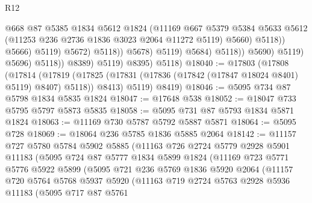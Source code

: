 \begin{lexlean}{R12}
\begin{coremodule}
                                              @668
                                              @87
                                              @5385
                                              @1834
                                              @5612
                                              @1824
                                              (@11169
                                                @667
                                                @5379
                                                @5384
                                                @5633
                                                @5612
                                                (@11253 @236 @2736 @1836 @3023 @2064 @11272 @5119)
                                                @5660)
                                              @5118))
                                          @5666)
                                        @5119)
                                      @5672)
                                    @5118))
                                @5678)
                              @5119)
                            @5684)
                          @5118))
                      @5690)
                    @5119)
                  @5696)
                @5118))
            @8389)
          @5119)
        @8395)
      @5118)
@18040 := @17803
    (@17808
      (@17814
        (@17819 (@17825 (@17831 (@17836 (@17842 (@17847 @18024 @8401) @5119) @8407) @5118)) @8413)
        @5119)
      @8419)
@18046 := @5095 @734 @87 @5798 @1834 @5835 @1824
@18047 := @17648 @538
@18052 := @18047 @733 @5795 @5797 @5873 @5835
@18058 := @5095 @731 @87 @5793 @1834 @5871 @1824
@18063 := @11169 @730 @5787 @5792 @5887 @5871
@18064 := @5095 @728
@18069 := @18064 @236 @5785 @1836 @5885 @2064
@18142 := @11157
    @727
    @5780
    @5784
    @5902
    @5885
    (@11163
      @726
      @2724
      @5779
      @2928
      @5901
      @11183
      (@5095
        @724
        @87
        @5777
        @1834
        @5899
        @1824
        (@11169
          @723
          @5771
          @5776
          @5922
          @5899
          (@5095
            @721
            @236
            @5769
            @1836
            @5920
            @2064
            (@11157
              @720
              @5764
              @5768
              @5937
              @5920
              (@11163
                @719
                @2724
                @5763
                @2928
                @5936
                @11183
                (@5095
                  @717
                  @87
                  @5761

\end{coremodule}
\end{lexlean}
